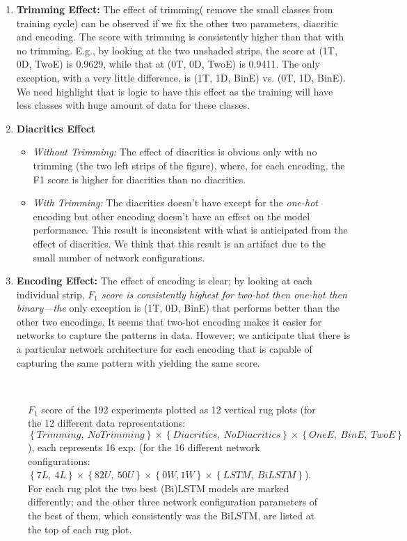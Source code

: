 \begin{enumerate}
\item \textbf{Trimming Effect:} The effect of trimming( remove the small classes from training cycle) can be observed if we fix the other two parameters, diacritic and encoding. The score with trimming is consistently higher than that with no trimming. E.g., by looking at the two unshaded strips, the score at (1T, 0D, TwoE) is 0.9629, while that at (0T, 0D, TwoE) is 0.9411. The only exception, with a very little difference, is (1T, 1D, BinE) vs. (0T, 1D, BinE). We need highlight that is logic to have this effect as the training will have less classes with huge amount of data for these classes.
\item \textbf{Diacritics Effect}
  \begin{itemize}
  \item \textit{Without Trimming:} The effect of diacritics is obvious only with no trimming (the two left strips of the figure), where, for each encoding, the F1 score is higher for diacritics than no diacritics.
    \item \textit{With Trimming:} The diacritics doesn't have except for the \textit{one-hot} encoding but other encoding doesn't have an effect on the model performance. This result is inconsistent with what is anticipated from the effect of diacritics. We think that this result is an artifact due to the small number of network configurations.

    \end{itemize} 
\item \textbf{Encoding Effect:} The effect of encoding is clear; by looking at each individual strip, \textit{$F_1$ score is consistently highest for two-hot then one-hot then binary—the} only exception is (1T, 0D, BinE) that performs better than the other two encodings. It seems that two-hot encoding makes it easier for networks to capture the patterns in data. However; we anticipate that there is a particular network architecture for each encoding that is capable of capturing the same pattern with yielding the same score.

  
  \end{enumerate}


  
\begin{figure}
 
 \caption{$F_1$ score of the 192 experiments plotted as 12 vertical rug plots (for the 12 different data representations: $\left\{\mathit{Trimming},\ \mathit{No Trimming} \right\} \times \left\{\mathit{Diacritics},\ \mathit{No Diacritics} \right\} \times \left\{\mathit{OneE},\ \mathit{BinE},\ \mathit{TwoE}\right\}$), each represents 16 exp. (for the 16 different network configurations: $\left\{7L,\ 4L\right\} \times \left\{82U,\ 50U\right\} \times \left\{0W, 1W\right\} \times \left\{LSTM,\ BiLSTM\right\}$). For each rug plot the two best (Bi)LSTM models are marked differently; and the other three network configuration parameters of the best of them, which consistently was the BiLSTM, are listed at the top of each rug plot.}~\label{fig:ArabicModelsResults}
\end{figure}

